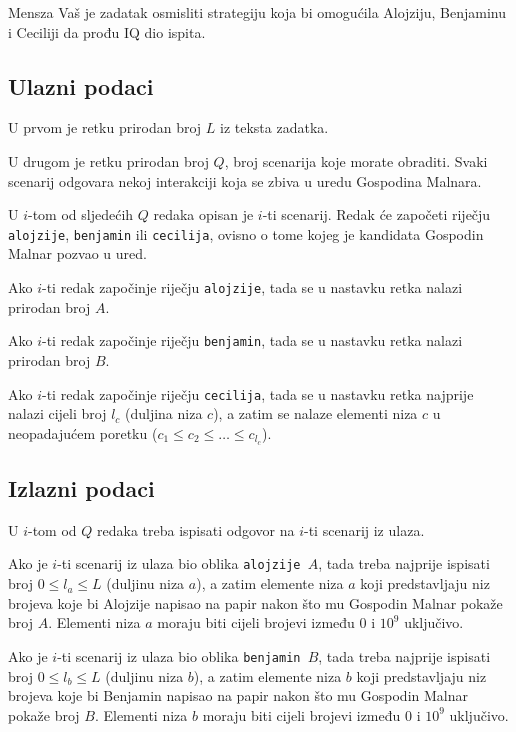 \begin{statement}[
  problempoints=100,
  timelimit=5 sekundi,
  memorylimit=512 MiB,
]{Mensza}
Vaš je zadatak osmisliti strategiju koja bi omogućila Alojziju, Benjaminu i
Ceciliji da prođu IQ dio ispita.

\subsection*{Ulazni podaci}
U prvom je retku prirodan broj $L$ iz teksta zadatka.

U drugom je retku prirodan broj $Q$, broj scenarija koje morate obraditi. Svaki
scenarij odgovara nekoj interakciji koja se zbiva u uredu Gospodina Malnara.

U $i$-tom od sljedećih $Q$ redaka opisan je $i$-ti scenarij. Redak će započeti
riječju \texttt{alojzije}, \texttt{benjamin} ili \texttt{cecilija}, ovisno o
tome kojeg je kandidata Gospodin Malnar pozvao u ured.

Ako $i$-ti redak započinje riječju \texttt{alojzije}, tada se u nastavku retka
nalazi prirodan broj $A$.

Ako $i$-ti redak započinje riječju \texttt{benjamin}, tada se u nastavku retka
nalazi prirodan broj $B$.

Ako $i$-ti redak započinje riječju \texttt{cecilija}, tada se u nastavku retka
najprije nalazi cijeli broj $l_c$ (duljina niza $c$), a zatim se nalaze
elementi niza $c$ u neopadajućem poretku ($c_1 \le c_2 \le \ldots \le c_{l_c}$).

\subsection*{Izlazni podaci}
U $i$-tom od $Q$ redaka treba ispisati odgovor na $i$-ti scenarij iz ulaza.

Ako je $i$-ti scenarij iz ulaza bio oblika \texttt{alojzije $A$}, tada treba
najprije ispisati broj $0 \le l_a \le L$ (duljinu niza $a$), a zatim elemente niza
$a$ koji predstavljaju niz brojeva koje bi Alojzije napisao na papir nakon što
mu Gospodin Malnar pokaže broj $A$. Elementi niza $a$ moraju biti cijeli brojevi
između $0$ i $10^9$ uključivo.

Ako je $i$-ti scenarij iz ulaza bio oblika \texttt{benjamin $B$}, tada treba
najprije ispisati broj $0 \le l_b \le L$ (duljinu niza $b$), a zatim elemente niza $b$ koji
predstavljaju niz brojeva koje bi Benjamin napisao na papir nakon što mu Gospodin
Malnar pokaže broj $B$. Elementi niza $b$ moraju biti cijeli brojevi između $0$
i $10^9$ uključivo.


\end{statement}
